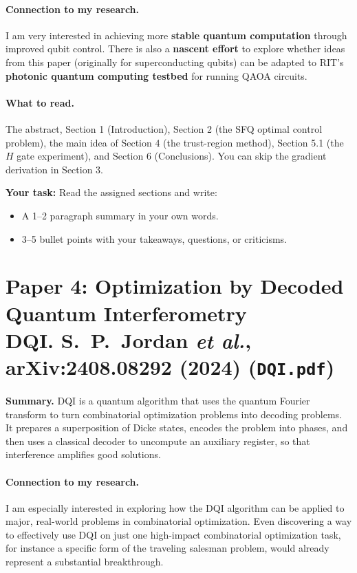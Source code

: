 \documentclass[11pt]{article}
\newenvironment{summary}{\par\noindent\textbf{Summary.} }{\par}
\newcommand{\yourtask}[1]{%
  \vspace{0.5em}
  \noindent\textbf{Your task:} #1
  \begin{itemize}
    \item A 1--2 paragraph summary in your own words.
    \item 3--5 bullet points with your takeaways, questions, or criticisms.
  \end{itemize}}
\begin{document}
\paragraph{Connection to my research.}
I am very interested in achieving more \textbf{stable quantum computation} through improved qubit
control. There is also a \textbf{nascent effort} to explore whether ideas from this paper
(originally for superconducting qubits) can be adapted to RIT's \textbf{photonic quantum computing
testbed} for running QAOA circuits. \smiley{}

\paragraph{What to read.}
The abstract, Section 1 (Introduction), Section 2 (the SFQ optimal control problem), the main idea
of Section 4 (the trust-region method), Section 5.1 (the $H$ gate experiment), and Section 6
(Conclusions). You can skip the gradient derivation in Section 3.

\yourtask{Read the assigned sections and write:}

\newpage

\section*{Paper 4: Optimization by Decoded Quantum Interferometry\\
\small{DQI. S.~P.~Jordan \emph{et al.}, arXiv:2408.08292 (2024) \quad (\texttt{DQI.pdf})}}

\begin{summary}
DQI is a quantum algorithm that uses the quantum Fourier transform to turn combinatorial optimization
problems into decoding problems. It prepares a superposition of Dicke states, encodes the problem
into phases, and then uses a classical decoder to uncompute an auxiliary register, so that
interference amplifies good solutions.
\end{summary}

\paragraph{Connection to my research.}
I am especially interested in exploring how the DQI algorithm can be applied to major, real-world
problems in combinatorial optimization. Even discovering a way to effectively use DQI on just one
high-impact combinatorial optimization task, for instance a specific form of the traveling salesman
problem, would already represent a substantial breakthrough. \smiley{}
\end{document}
